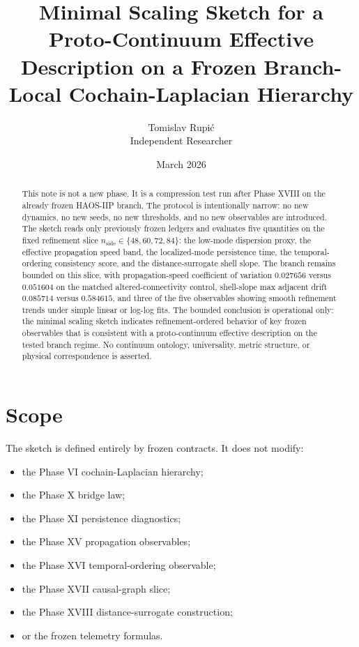 \documentclass[11pt]{article}
\title{Minimal Scaling Sketch for a Proto-Continuum Effective Description on a Frozen Branch-Local Cochain-Laplacian Hierarchy}
\author{Tomislav Rupi\'c \\ Independent Researcher}
\date{March 2026}
\begin{document}
\maketitle

\begin{abstract}
This note is not a new phase. It is a compression test run after Phase XVIII on the already frozen HAOS-IIP branch. The protocol is intentionally narrow: no new dynamics, no new seeds, no new thresholds, and no new observables are introduced. The sketch reads only previously frozen ledgers and evaluates five quantities on the fixed refinement slice $n_{\mathrm{side}} \in \{48,60,72,84\}$: the low-mode dispersion proxy, the effective propagation speed band, the localized-mode persistence time, the temporal-ordering consistency score, and the distance-surrogate shell slope. The branch remains bounded on this slice, with propagation-speed coefficient of variation $0.027656$ versus $0.051604$ on the matched altered-connectivity control, shell-slope max adjacent drift $0.085714$ versus $0.584615$, and three of the five observables showing smooth refinement trends under simple linear or log-log fits. The bounded conclusion is operational only: the minimal scaling sketch indicates refinement-ordered behavior of key frozen observables that is consistent with a proto-continuum effective description on the tested branch regime. No continuum ontology, universality, metric structure, or physical correspondence is asserted.
\end{abstract}

\section{Scope}

The sketch is defined entirely by frozen contracts. It does not modify:
\begin{itemize}
\item the Phase VI cochain-Laplacian hierarchy;
\item the Phase X bridge law;
\item the Phase XI persistence diagnostics;
\item the Phase XV propagation observables;
\item the Phase XVI temporal-ordering observable;
\item the Phase XVII causal-graph slice;
\item the Phase XVIII distance-surrogate construction;
\item or the frozen telemetry formulas.
\end{itemize}
\end{document}

